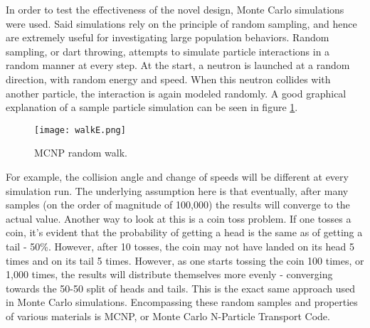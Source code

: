 In order to test the effectiveness of the novel design, Monte Carlo simulations were used. Said simulations rely on the principle of random sampling, and hence are extremely useful for investigating large population behaviors. Random sampling, or dart throwing, attempts to simulate particle interactions in a random manner at every step. At the start, a neutron is launched at a random direction, with random energy and speed. When this neutron collides with another particle, the interaction is again modeled randomly. A good graphical explanation of a sample particle simulation can be seen in figure \ref{fig:randomwalk}.
\begin{figure}[!htbp]
\caption{MCNP random walk.}
\label{fig:randomwalk}
\centering
\texttt{[image: walkE.png]}
\end{figure}
For example, the collision angle and change of speeds will be different at every simulation run. The underlying assumption here is that eventually, after many samples (on the order of magnitude of 100,000) the results will converge to the actual value. Another way to look at this is a coin toss problem. If one tosses a coin, it's evident that the probability of getting a head is the same as of getting a tail - 50\%. However, after 10 tosses, the coin may not have landed on its head 5 times and on its tail 5 times. However, as one starts tossing the coin 100 times, or 1,000 times, the results will distribute themselves more evenly - converging towards the 50-50 split of heads and tails. This is the exact same approach used in Monte Carlo simulations. Encompassing these random samples and properties of various materials is MCNP, or Monte Carlo N-Particle Transport Code.

